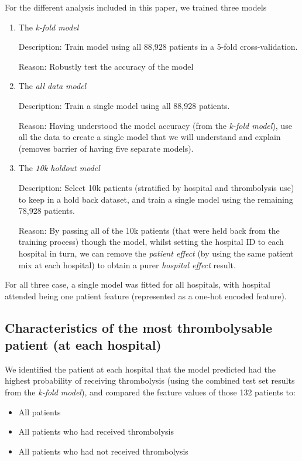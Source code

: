 For the different analysis included in this paper, we trained three models
\begin{enumerate}
    \item {The \emph{k-fold model}}
    
    Description: Train model using all 88,928 patients in a 5-fold cross-validation.
    
    Reason: Robustly test the accuracy of the model
    \item {The \emph{all data model}}
    
    Description: Train a single model using all 88,928 patients.
    
    Reason: Having understood the model accuracy (from the \emph{k-fold model}), use all the data to create a single model that we will understand and explain (removes barrier of having five separate models).
    \item {The \emph{10k holdout model}}

    Description: Select 10k patients (stratified by hospital and thrombolysis use) to keep in a hold back dataset, and train a single model using the remaining 78,928 patients. 
    
    Reason: By passing all of the 10k patients (that were held back from the training process) though the model, whilst setting the hospital ID to each hospital in turn, we can remove the \emph{patient effect} (by using the same patient mix at each hospital) to obtain a purer \emph{hospital effect} result.
\end{enumerate}

For all three case, a single model was fitted for all hospitals, with hospital attended being one patient feature (represented as a one-hot encoded feature).

\subsection{Characteristics of the most thrombolysable patient (at each hospital)}
We identified the patient at each hospital that the model predicted had the highest probability of receiving thrombolysis (using the combined test set results from the \emph{k-fold model}), and compared the feature values of those 132 patients to:
\begin{itemize}
\item All patients
\item All patients who had received thrombolysis
\item All patients who had not received thrombolysis
\end{itemize}
